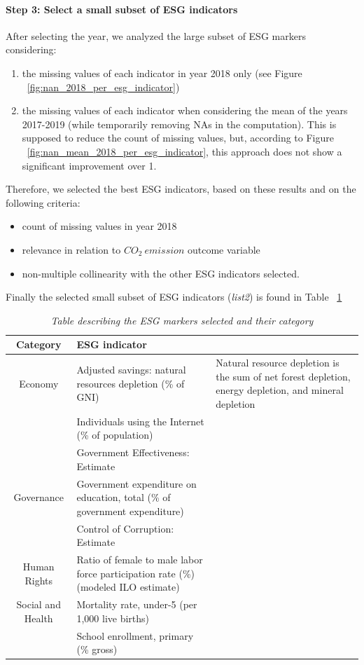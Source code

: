 \documentclass{article}
\begin{document}
	\paragraph{Step 3: Select a small subset of ESG indicators}
	After selecting the year, we analyzed the large subset of ESG markers  considering:
	\begin{enumerate}
		\item the missing values of each indicator in year 2018 only (see Figure ~\ref{fig:nan_2018_per_esg_indicator})
		\item the missing values of each indicator when considering the mean of the years 2017-2019 (while temporarily removing NAs in the computation). This is supposed to reduce the count of missing values, but, according to Figure ~\ref{fig:nan_mean_2018_per_esg_indicator}, this approach does not show a significant improvement over 1.
	\end{enumerate}
	
	Therefore, we selected the best ESG indicators, based on these results and on the following criteria:
	\begin{itemize}
		\item count of missing values in year 2018
		\item relevance in relation to $CO_2\ emission$ outcome variable
		\item non-multiple collinearity with the other ESG indicators selected.
	\end{itemize}
	
	Finally the selected small subset of ESG indicators (\textit{list2}) is found in Table ~\ref{table:esg_small_set} 
	
	\begin{table}
		\centering
		\begin{tabular}{|c|p{7cm}|p{5cm}|}
			\cline{1-3}
			Category & ESG indicator & \\
			\hline \hline
			Economy & Adjusted savings: natural resources depletion (\% of GNI) & Natural resource depletion is the sum of net forest depletion, energy depletion, and mineral depletion\\
			& Individuals using the Internet (\% of population) & \\
			\hline
			& Government Effectiveness: Estimate & \\
			Governance & Government expenditure on education, total (\% of government expenditure) & \\
			& Control of Corruption: Estimate & \\
			\hline
			Human Rights & Ratio of female to male labor force participation rate (\%) (modeled ILO estimate) & \\
			\hline
			Social and Health & Mortality rate, under-5 (per 1,000 live births) & \\
			& School enrollment, primary (\% gross) & \\
			\cline{1-3}
		\end{tabular}
		\caption{\textit{Table describing the ESG markers selected and their category}}
		\label{table:esg_small_set}
	\end{table}
\end{document}
